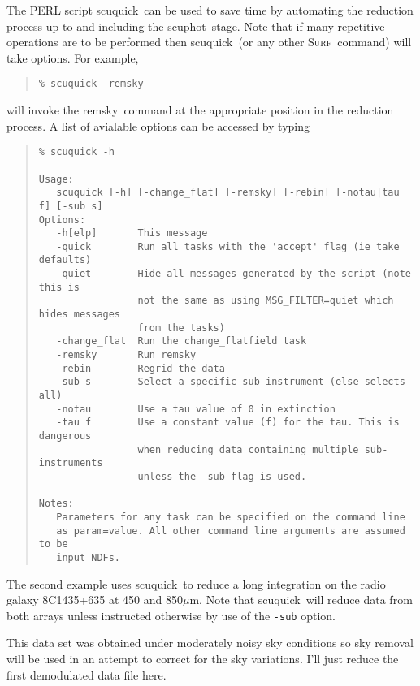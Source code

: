 \documentclass[twoside,11pt,fleqn]{article}
\newenvironment{myquote}{\begin{quote}\begin{small}}{\end{small}\end{quote}}
\newcommand{\surf}{\xref{\textsc{Surf}}{sun216}{}}
\newcommand{\task}[1]{{\sf #1}}
\newcommand{\scuphot}{\xref{\task{scuphot}}{sun216}{SCUPHOT}}
\newcommand{\scuquick}{\xref{\task{scuquick}}{sun216}{SCUQUICK}}
\newcommand{\remsky}{\xref{\task{remsky}}{sun216}{REMSKY}}
\newcommand{\xref}[3]{#1}
\begin{document}
The PERL script \scuquick\ can be used to save time by automating
the reduction process up to and including the \scuphot\ stage.
Note that if many repetitive operations are to be performed then
\scuquick\ (or any other \surf\ command) will take options.
For example, 
\begin{myquote}
\begin{verbatim}
% scuquick -remsky
\end{verbatim}
\end{myquote}
will invoke the \remsky\ command at the appropriate position in
the reduction process. A list of avialable options can be accessed by typing
\begin{myquote}
\begin{verbatim}
% scuquick -h
 
Usage:
   scuquick [-h] [-change_flat] [-remsky] [-rebin] [-notau|tau f] [-sub s]
Options:
   -h[elp]       This message
   -quick        Run all tasks with the 'accept' flag (ie take defaults)
   -quiet        Hide all messages generated by the script (note this is 
                 not the same as using MSG_FILTER=quiet which hides messages
                 from the tasks)
   -change_flat  Run the change_flatfield task
   -remsky       Run remsky
   -rebin        Regrid the data
   -sub s        Select a specific sub-instrument (else selects all)
   -notau        Use a tau value of 0 in extinction
   -tau f        Use a constant value (f) for the tau. This is dangerous
                 when reducing data containing multiple sub-instruments
                 unless the -sub flag is used.

Notes:
   Parameters for any task can be specified on the command line
   as param=value. All other command line arguments are assumed to be
   input NDFs. 
\end{verbatim}
\end{myquote}

The second example uses \scuquick\ to reduce a long integration on 
the radio galaxy 8C1435+635 at 450 and 850$\mu$m. Note that 
\scuquick\ will reduce data from both arrays unless instructed
otherwise by use of the {\tt -sub} option.

This data set was obtained under moderately noisy sky conditions so
sky removal will be used in an attempt to correct for the sky
variations. I'll just reduce the first demodulated data file here.
\end{document}
